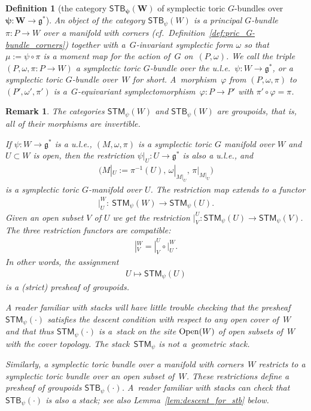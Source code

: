 \documentclass[10pt,a4paper]{amsart}
\numberwithin{equation}{section}
\newtheorem{Definition}[Lemma]{Definition}
\newtheorem{Remark}[Lemma]{Remark}
\begin{document}
\begin{Definition}[the category $\mathbf{{\textsf{STB}}_\psi (W)}$ of symplectic toric
  $G$-bundles over $\mathbf{\psi\colon W\to {\mathfrak g}^*}$] \label{def:STB}
  An  \emph{object} of the category ${\textsf{STB}}_\psi (W)$ is a principal
  $G$-bundle $\pi\colon P\to W$ over a manifold with corners (cf.\
  Def\/inition~\ref{def:pric_G-bundle_corners}) together with a~$G$-invariant symplectic form $\omega$ so that $\mu := \psi \circ
  \pi$ is a moment map for the action of~$G$ on~$(P,\omega)$.
  We call the triple $(P,\omega, \pi\colon  P \to W)$
  a {\em symplectic toric $G$-bundle over the u.l.e.\ $\psi\colon  W\to {\mathfrak g}^*$},
  or a symplectic toric $G$-bundle over~$W$ for short.
  A~\emph{morphism}~$\varphi$ from $(P, \omega, \pi)$ to
  $(P', \omega', \pi')$ is a~$G$-equivariant
  symplectomorphism~$\varphi \colon P \to P'$ with $\pi' \circ
  \varphi = \pi$.
\end{Definition}

\begin{Remark}
 The categories ${\textsf{STM}}_\psi(W)$ and ${\textsf{STB}}_\psi(W)$
are groupoids, that is, all of their morphisms are invertible.


  If $\psi \colon W\to {\mathfrak g}^*$ is a u.l.e., $(M,\omega, \pi)$ is a symplectic
  toric $G$ manifold over $W$ and $U\subset W$ is open, then the restriction
  $\psi|_U\colon U \to {\mathfrak g}^*$ is also a u.l.e., and
\begin{gather*}
\big(M|_U:= \pi^{-1} (U),\, \omega|_{M|_U},\, \pi|_{M|_U}\big)
\end{gather*}
is a symplectic toric $G$-manifold over $U$.
The restriction map extends to a functor
\begin{gather*}
|^W_U\colon \  {\textsf{STM}}_\psi (W) \to {\textsf{STM}}_\psi(U).
\end{gather*}
Given an open subset $V$ of $U$ we get the restriction $|_V^U\colon
{\textsf{STM}}_\psi(U)\to {\textsf{STM}}_\psi(V)$.  The three restriction functors are
compatible:
\begin{gather*}
|^W_V = |^U_V \circ |^W_U.
\end{gather*}
In other words, the assignment
\begin{gather*}
U\mapsto {\textsf{STM}}_\psi (U)
\end{gather*}
is a (strict) presheaf of groupoids.

A reader familiar with stacks will have little trouble checking that
the presheaf ${\textsf{STM}}_\psi (\cdot)$ satisf\/ies the descent condition with
respect to any open cover of~$W$ and that thus ${\textsf{STM}}_\psi (\cdot )$ is
a~stack on the site ${\rm Open}(W)$ of open subsets of~$W$ with the cover
topology.  The stack~${\textsf{STM}}_\psi $ is not a~geometric stack.

Similarly, a symplectic toric bundle over a
manifold with corners~$W$ restricts to a symplectic toric bundle over
an open subset of~$W$.  These restrictions def\/ine a presheaf of
groupoids ${\textsf{STB}}_\psi (\cdot )$.  A~reader familiar with stacks can
check that ${\textsf{STB}}_\psi (\cdot )$ is also a stack; see also
Lemma~\ref{lem:descent_for_stb} below.
\end{Remark}
\end{document}
